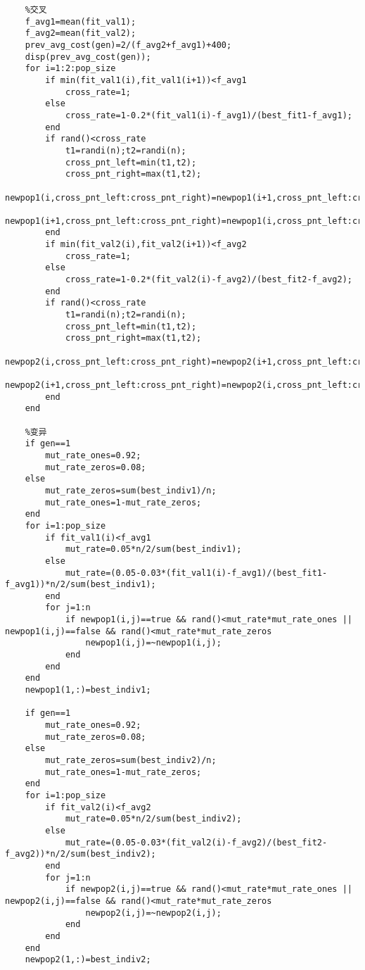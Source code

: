 \documentclass[withoutpreface,bwprint]{cumcmthesis} %
\begin{document}
\begin{appendices}
\begin{lstlisting}
    %交叉
    f_avg1=mean(fit_val1);
    f_avg2=mean(fit_val2);
    prev_avg_cost(gen)=2/(f_avg2+f_avg1)+400;
    disp(prev_avg_cost(gen));
    for i=1:2:pop_size
        if min(fit_val1(i),fit_val1(i+1))<f_avg1
            cross_rate=1;
        else
            cross_rate=1-0.2*(fit_val1(i)-f_avg1)/(best_fit1-f_avg1);
        end
        if rand()<cross_rate
            t1=randi(n);t2=randi(n);
            cross_pnt_left=min(t1,t2);
            cross_pnt_right=max(t1,t2);
            newpop1(i,cross_pnt_left:cross_pnt_right)=newpop1(i+1,cross_pnt_left:cross_pnt_right);
            newpop1(i+1,cross_pnt_left:cross_pnt_right)=newpop1(i,cross_pnt_left:cross_pnt_right);
        end
        if min(fit_val2(i),fit_val2(i+1))<f_avg2
            cross_rate=1;
        else
            cross_rate=1-0.2*(fit_val2(i)-f_avg2)/(best_fit2-f_avg2);
        end
        if rand()<cross_rate
            t1=randi(n);t2=randi(n);
            cross_pnt_left=min(t1,t2);
            cross_pnt_right=max(t1,t2);
            newpop2(i,cross_pnt_left:cross_pnt_right)=newpop2(i+1,cross_pnt_left:cross_pnt_right);
            newpop2(i+1,cross_pnt_left:cross_pnt_right)=newpop2(i,cross_pnt_left:cross_pnt_right);
        end
    end
    
    %变异
    if gen==1
        mut_rate_ones=0.92;
        mut_rate_zeros=0.08;
    else
        mut_rate_zeros=sum(best_indiv1)/n;
        mut_rate_ones=1-mut_rate_zeros;
    end
    for i=1:pop_size
        if fit_val1(i)<f_avg1
            mut_rate=0.05*n/2/sum(best_indiv1);
        else
            mut_rate=(0.05-0.03*(fit_val1(i)-f_avg1)/(best_fit1-f_avg1))*n/2/sum(best_indiv1);
        end
        for j=1:n
            if newpop1(i,j)==true && rand()<mut_rate*mut_rate_ones || newpop1(i,j)==false && rand()<mut_rate*mut_rate_zeros
                newpop1(i,j)=~newpop1(i,j);
            end
        end
    end
    newpop1(1,:)=best_indiv1;

    if gen==1
        mut_rate_ones=0.92;
        mut_rate_zeros=0.08;
    else
        mut_rate_zeros=sum(best_indiv2)/n;
        mut_rate_ones=1-mut_rate_zeros;
    end
    for i=1:pop_size
        if fit_val2(i)<f_avg2
            mut_rate=0.05*n/2/sum(best_indiv2);
        else
            mut_rate=(0.05-0.03*(fit_val2(i)-f_avg2)/(best_fit2-f_avg2))*n/2/sum(best_indiv2);
        end
        for j=1:n
            if newpop2(i,j)==true && rand()<mut_rate*mut_rate_ones || newpop2(i,j)==false && rand()<mut_rate*mut_rate_zeros
                newpop2(i,j)=~newpop2(i,j);
            end
        end
    end
    newpop2(1,:)=best_indiv2;
    

\end{lstlisting}
\end{appendices}
\end{document}
